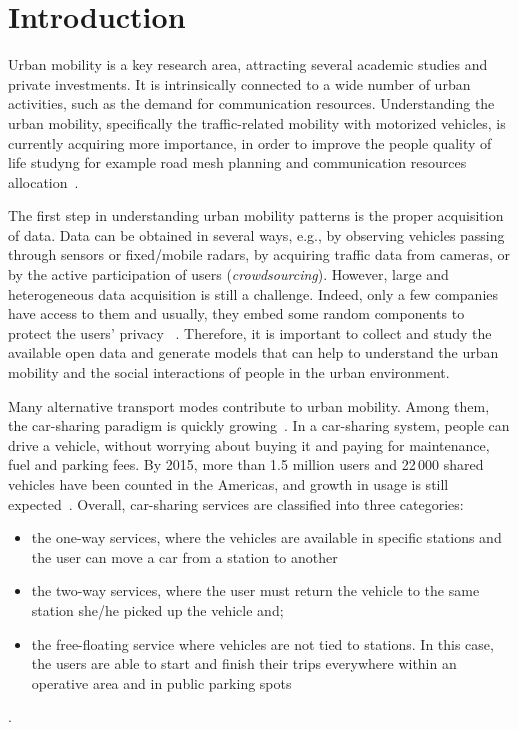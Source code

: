 \section{Introduction}
\label{sec:4_1_intro}

Urban mobility is a key research area, attracting several academic studies and private investments. It is intrinsically connected to a wide number of urban activities, such as the demand for communication resources. Understanding the urban mobility, specifically the traffic-related mobility with motorized vehicles, is currently acquiring more importance, in order to improve the people quality of life studyng for example road mesh planning and communication resources allocation~\cite{herrera:10, Ma:2013}.

The first step in understanding urban mobility patterns is the proper acquisition of data. Data can be obtained in several ways, e.g., by observing vehicles passing through sensors or fixed/mobile radars, by acquiring traffic data from cameras, or by the active participation of users (\textit{crowdsourcing}). However, large and heterogeneous data acquisition is still a challenge. Indeed, only a few companies have access to them and usually, they embed some random components to protect the users' privacy ~\cite{ciociolaumap}. Therefore, it is important to collect and study the available open data and generate models that can help to understand the urban mobility and the social interactions of people in the urban environment.


Many alternative transport modes contribute to urban mobility. Among them, the car-sharing paradigm is quickly growing~\cite{boldrini:16,ciociolaumap,becker2017comparing}. In a car-sharing system, people can drive a vehicle, without worrying about buying it and paying for maintenance, fuel and parking fees. %
By 2015, more than 1.5 million users and 22\,000 shared vehicles have been counted in the Americas, and growth in usage is still expected~\cite{shaheen2016mobility}. 
Overall, car-sharing services are classified into three categories: 
\begin{itemize}
		\item the one-way services, where the vehicles are available in specific stations and the user can move a car from a station to another
		\item the two-way services, where the user must return the vehicle to the same station she/he picked up the vehicle and;
		\item the free-floating service where vehicles are not tied to stations. In this case, the users are able to start and finish their trips everywhere within an operative area and in public parking spots~\cite{boldrini:16}
\end{itemize}. 

